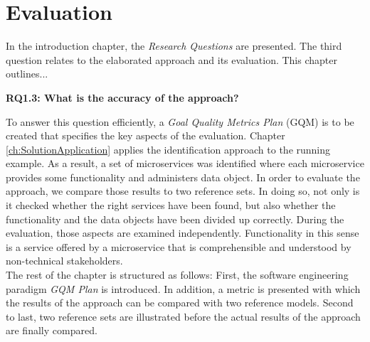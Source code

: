 \chapter{Evaluation}
\label{ch:Evalutation}
In the introduction chapter, the \textit{Research Questions} are presented. The third question relates to the elaborated approach and its evaluation. This chapter outlines... %



\vspace{0.5cm}
\par
\begingroup
\leftskip=1cm
\rightskip=1cm

\noindent
\textbf{RQ1.3: What is the accuracy of the approach? }

\endgroup
\vspace{0.5cm}

\noindent
To answer this question efficiently, a \textit{Goal Quality Metrics Plan } (GQM) is to be created that specifies the key aspects of the evaluation. 
Chapter \ref{ch:SolutionApplication} applies the identification approach to the running example. As a result, a set of microservices was identified where each microservice provides some functionality and administers data object.
In order to evaluate the approach, we compare those results to two reference sets. In doing so, not only is it checked whether the right services have been found, but also whether the functionality and the data objects have been divided up correctly. During the evaluation, those aspects are examined independently. Functionality in this sense is a service offered by a microservice that is comprehensible and understood by non-technical stakeholders. 
\\
The rest of the chapter is structured as follows: First, the software engineering paradigm \textit{GQM Plan} is introduced. In addition, a metric is presented with which the results of the approach can be compared with two reference models. Second to last, two reference sets are illustrated before the actual results of the approach are finally compared.




